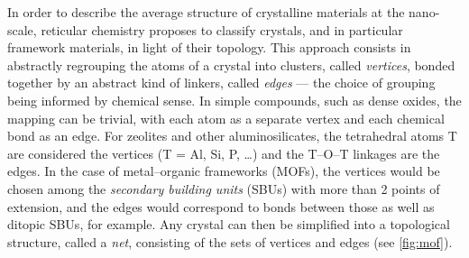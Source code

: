\documentclass[main.tex]{subfiles}
\begin{document}
\label{topology_introduction}

In order to describe the average structure of crystalline materials at the nano-scale, reticular chemistry \autocite{reticularChemistry, reticularSynthesis} proposes to classify crystals, and in particular framework materials, in light of their topology. This approach consists in abstractly regrouping the atoms of a crystal into clusters, called \emph{vertices}, bonded together by an abstract kind of linkers, called \emph{edges} --- the choice of grouping being informed by chemical sense. In simple compounds, such as dense oxides, the mapping can be trivial, with each atom as a separate vertex and each chemical bond as an edge. For zeolites and other aluminosilicates, the tetrahedral atoms T are considered the vertices (T = Al, Si, P, \ldots) and the T--O--T linkages are the edges. In the case of metal--organic frameworks (MOFs), the vertices would be chosen among the \emph{secondary building units} (SBUs) \autocite{SBUs} with more than 2 points of extension, and the edges would correspond to bonds between those as well as ditopic SBUs, for example. Any crystal can then be simplified into a topological structure, called a \emph{net}, consisting of the sets of vertices and edges (see \cref{fig:mof}).
\end{document}

